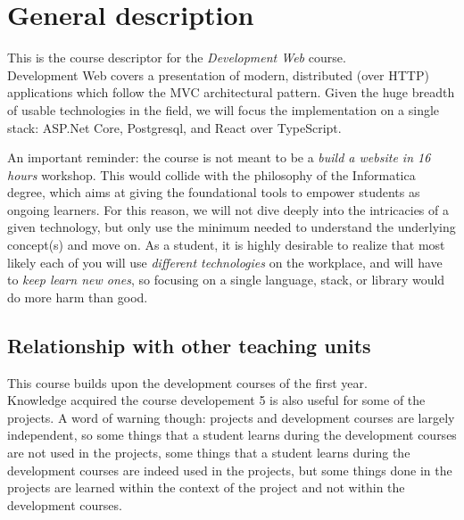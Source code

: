 \section{General description}
	This is the course descriptor for the \emph{Development Web} course.
\\
Development Web covers a presentation of modern, distributed (over HTTP)
applications which follow the MVC architectural pattern. Given the huge
breadth of usable technologies in the field, we will focus the
implementation on a single stack: ASP.Net Core, Postgresql, and React
over TypeScript.

An important reminder: the course is not meant to be a \emph{build a
website in 16 hours} workshop. This would collide with the philosophy of
the Informatica degree, which aims at giving the foundational tools to
empower students as ongoing learners. For this reason, we will not dive
deeply into the intricacies of a given technology, but only use the
minimum needed to understand the underlying concept(s) and move on. As a
student, it is highly desirable to realize that most likely each of you
will use \emph{different technologies} on the workplace, and will have
to \emph{keep learn new ones}, so focusing on a single language, stack,
or library would do more harm than good.

	\subsection{Relationship with other teaching units}
		This course builds upon the development courses of the first year.	\\		
		Knowledge acquired the course developement 5 is also useful for some of the projects. A word of warning though: projects and development courses are largely independent, so some things that a student learns during the development courses are not used in the projects, some things that a student learns during the development courses are indeed used in the projects, but some things done in the projects are learned within the context of the project and not within the development courses.
